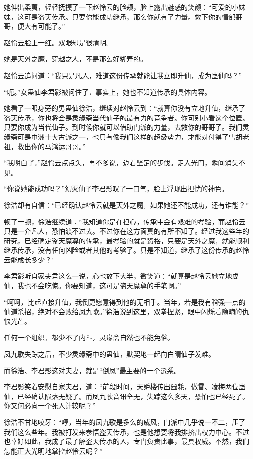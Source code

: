 \begin{this_body}
她伸出柔荑，轻轻抚摸了一下赵怜云的脸颊，脸上露出魅惑的笑颜：“可爱的小妹妹，这可是盗天传承。只要你能成功继承，那么你就有了力量。救下你的情郎哥哥，便大有可能了。”

赵怜云脸上一红。双眼却是很清明。

她是天外之魔，穿越之人，不是那么好糊弄的。

赵怜云追问道：“我只是凡人，难道这份传承就能让我立即升仙，成为蛊仙吗？”

“呃。”女蛊仙李君影被问住了，事实上，她也不知道传承的具体内容。

她看了一眼身旁的男蛊仙徐浩，继续对赵怜云到：“就算你没有立地升仙，继承了盗天传承，你也将会是灵缘斋当代仙子的最有力的竞争者。你可别小看这个位置。只要你成为当代仙子。到时候你就可以借助门派的力量，去救你的哥哥了。我们灵缘斋可是中洲十大古派之一，也只有像我们这样的超级势力，才能对付得了雪胡老祖，救出你的马鸿运哥哥。”

“我明白了。”赵怜云点点头，再不多说，迈着坚定的步伐。走入光门，瞬间消失不见。

“你说她能成功吗？”幻灭仙子李君影叹了一口气，脸上浮现出担忧的神色。

徐浩却有自信：“已经确认赵怜云就是天外之魔，如果她还不能成功，还有谁能？”

顿了一顿，徐浩继续道：“我知道你是在担心，传承中会有艰难的考验，而赵怜云只是一介凡人，恐怕渡不过去。不过你在这方面真的有所不知了。经过我这些年的研究，已经确定盗天魔尊的传承，最考验的就是资格，只要是天外之魔，就能顺利继承传承，没有任何凶险或者其他的考验了。只是不知道，继承了这份传承的赵怜云能成长多少？”

李君影听自家夫君这么一说，心也放下大半，微笑道：“就算是赵怜云她立地成仙，我也不会吃惊。你要知道，这可是盗天魔尊的手笔啊。”

“呵呵，比起直接升仙，我倒更愿意得到他的无相手。当年，若是我有稍强一点的仙道杀招，绝对不会败给凤九歌。”徐浩说到这里，双拳捏紧，眼中闪烁着隐晦的仇恨光芒。

任何一个组织，都少不了内斗，灵缘斋自然也不能免俗。

凤九歌失踪之后，不少灵缘斋中的蛊仙，默契地一起向白晴仙子发难。

而徐浩、李君影这对夫妻，就是“倒凤”最主要的一个派系。

李君影笑着安慰自家夫君，道：“前段时间，天妒楼传出噩耗，傲雪、凌梅两位蛊仙，已经确认陨落无疑了。而凤九歌音讯全无，失踪这么多天，恐怕也已经死了。你又何必向一个死人计较呢？”

徐浩不甘地咬牙：“哼，当年的凤九歌是多么的威风，门派中几乎说一不二，压了我们这么些年。我被打发来参悟盗天传承，也是他想要将我排挤出权力中心。不过也幸好如此，我成了最了解盗天传承的人，专门负责此事，最具权威。不然，我们怎能正大光明地掌控赵怜云呢？”


\end{this_body}

